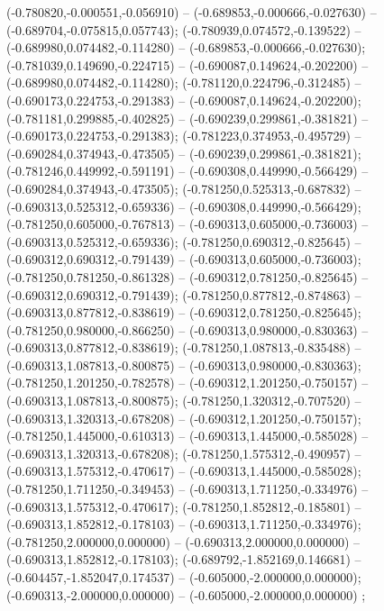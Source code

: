  (-0.780820,-0.000551,-0.056910) -- (-0.689853,-0.000666,-0.027630) -- (-0.689704,-0.075815,0.057743);
 (-0.780939,0.074572,-0.139522) -- (-0.689980,0.074482,-0.114280) -- (-0.689853,-0.000666,-0.027630);
 (-0.781039,0.149690,-0.224715) -- (-0.690087,0.149624,-0.202200) -- (-0.689980,0.074482,-0.114280);
 (-0.781120,0.224796,-0.312485) -- (-0.690173,0.224753,-0.291383) -- (-0.690087,0.149624,-0.202200);
 (-0.781181,0.299885,-0.402825) -- (-0.690239,0.299861,-0.381821) -- (-0.690173,0.224753,-0.291383);
 (-0.781223,0.374953,-0.495729) -- (-0.690284,0.374943,-0.473505) -- (-0.690239,0.299861,-0.381821);
 (-0.781246,0.449992,-0.591191) -- (-0.690308,0.449990,-0.566429) -- (-0.690284,0.374943,-0.473505);
 (-0.781250,0.525313,-0.687832) -- (-0.690313,0.525312,-0.659336) -- (-0.690308,0.449990,-0.566429);
 (-0.781250,0.605000,-0.767813) -- (-0.690313,0.605000,-0.736003) -- (-0.690313,0.525312,-0.659336);
 (-0.781250,0.690312,-0.825645) -- (-0.690312,0.690312,-0.791439) -- (-0.690313,0.605000,-0.736003);
 (-0.781250,0.781250,-0.861328) -- (-0.690312,0.781250,-0.825645) -- (-0.690312,0.690312,-0.791439);
 (-0.781250,0.877812,-0.874863) -- (-0.690313,0.877812,-0.838619) -- (-0.690312,0.781250,-0.825645);
 (-0.781250,0.980000,-0.866250) -- (-0.690313,0.980000,-0.830363) -- (-0.690313,0.877812,-0.838619);
 (-0.781250,1.087813,-0.835488) -- (-0.690313,1.087813,-0.800875) -- (-0.690313,0.980000,-0.830363);
 (-0.781250,1.201250,-0.782578) -- (-0.690312,1.201250,-0.750157) -- (-0.690313,1.087813,-0.800875);
 (-0.781250,1.320312,-0.707520) -- (-0.690313,1.320313,-0.678208) -- (-0.690312,1.201250,-0.750157);
 (-0.781250,1.445000,-0.610313) -- (-0.690313,1.445000,-0.585028) -- (-0.690313,1.320313,-0.678208);
 (-0.781250,1.575312,-0.490957) -- (-0.690313,1.575312,-0.470617) -- (-0.690313,1.445000,-0.585028);
 (-0.781250,1.711250,-0.349453) -- (-0.690313,1.711250,-0.334976) -- (-0.690313,1.575312,-0.470617);
 (-0.781250,1.852812,-0.185801) -- (-0.690313,1.852812,-0.178103) -- (-0.690313,1.711250,-0.334976);
 (-0.781250,2.000000,0.000000) -- (-0.690313,2.000000,0.000000) -- (-0.690313,1.852812,-0.178103);
 (-0.689792,-1.852169,0.146681) -- (-0.604457,-1.852047,0.174537) -- (-0.605000,-2.000000,0.000000);
 (-0.690313,-2.000000,0.000000) -- (-0.605000,-2.000000,0.000000) ;
